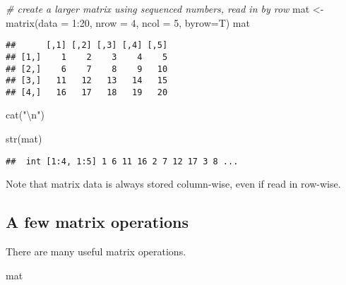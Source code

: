 \documentclass[
]{article}
\newenvironment{Shaded}{\begin{snugshade}}{\end{snugshade}}
\newcommand{\AttributeTok}[1]{\textcolor[rgb]{0.77,0.63,0.00}{#1}}
\newcommand{\CommentTok}[1]{\textcolor[rgb]{0.56,0.35,0.01}{\textit{#1}}}
\newcommand{\DecValTok}[1]{\textcolor[rgb]{0.00,0.00,0.81}{#1}}
\newcommand{\FunctionTok}[1]{\textcolor[rgb]{0.00,0.00,0.00}{#1}}
\newcommand{\NormalTok}[1]{#1}
\newcommand{\OtherTok}[1]{\textcolor[rgb]{0.56,0.35,0.01}{#1}}
\newcommand{\SpecialCharTok}[1]{\textcolor[rgb]{0.00,0.00,0.00}{#1}}
\newcommand{\StringTok}[1]{\textcolor[rgb]{0.31,0.60,0.02}{#1}}
\begin{document}
\begin{Shaded}
\begin{Highlighting}[]
\CommentTok{\# create a larger matrix using sequenced numbers, read in by row}
\NormalTok{mat }\OtherTok{\textless{}{-}} \FunctionTok{matrix}\NormalTok{(}\AttributeTok{data =} \DecValTok{1}\SpecialCharTok{:}\DecValTok{20}\NormalTok{, }\AttributeTok{nrow =} \DecValTok{4}\NormalTok{, }\AttributeTok{ncol =} \DecValTok{5}\NormalTok{, }\AttributeTok{byrow=}\NormalTok{T)}
\NormalTok{mat}
\end{Highlighting}
\end{Shaded}

\begin{verbatim}
##      [,1] [,2] [,3] [,4] [,5]
## [1,]    1    2    3    4    5
## [2,]    6    7    8    9   10
## [3,]   11   12   13   14   15
## [4,]   16   17   18   19   20
\end{verbatim}

\begin{Shaded}
\begin{Highlighting}[]
\FunctionTok{cat}\NormalTok{(}\StringTok{"}\SpecialCharTok{\textbackslash{}n}\StringTok{"}\NormalTok{)}
\end{Highlighting}
\end{Shaded}

\begin{Shaded}
\begin{Highlighting}[]
\FunctionTok{str}\NormalTok{(mat)}
\end{Highlighting}
\end{Shaded}

\begin{verbatim}
##  int [1:4, 1:5] 1 6 11 16 2 7 12 17 3 8 ...
\end{verbatim}

Note that matrix data is always stored column-wise, even if read in
row-wise.

\hypertarget{a-few-matrix-operations}{%
\subsection{A few matrix operations}\label{a-few-matrix-operations}}

There are many useful matrix operations.

\begin{Shaded}
\begin{Highlighting}[]
\NormalTok{mat}
\end{Highlighting}
\end{Shaded}
\end{document}
